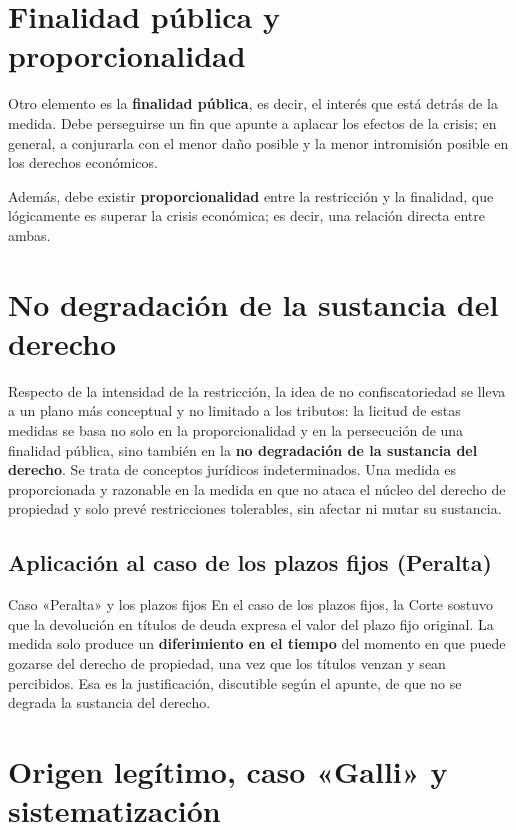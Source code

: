 \documentclass[12pt,oneside]{book}
\begin{document}
\section{Finalidad pública y proporcionalidad}

Otro elemento es la \textbf{finalidad pública}, es decir, el interés que está detrás de la medida. Debe perseguirse un fin que apunte a aplacar los efectos de la crisis; en general, a conjurarla con el menor daño posible y la menor intromisión posible en los derechos económicos.

Además, debe existir \textbf{proporcionalidad} entre la restricción y la finalidad, que lógicamente es superar la crisis económica; es decir, una relación directa entre ambas.

\section{No degradación de la sustancia del derecho}

Respecto de la intensidad de la restricción, la idea de no confiscatoriedad se lleva a un plano más conceptual y no limitado a los tributos: la licitud de estas medidas se basa no solo en la proporcionalidad y en la persecución de una finalidad pública, sino también en la \textbf{no degradación de la sustancia del derecho}. Se trata de conceptos jurídicos indeterminados. Una medida es proporcionada y razonable en la medida en que no ataca el núcleo del derecho de propiedad y solo prevé restricciones tolerables, sin afectar ni mutar su sustancia.

\subsection{Aplicación al caso de los plazos fijos (Peralta)}

\begin{example}{Caso «Peralta» y los plazos fijos}
En el caso de los plazos fijos, la Corte sostuvo que la devolución en títulos de deuda expresa el valor del plazo fijo original. La medida solo produce un \textbf{diferimiento en el tiempo} del momento en que puede gozarse del derecho de propiedad, una vez que los títulos venzan y sean percibidos. Esa es la justificación, discutible según el apunte, de que no se degrada la sustancia del derecho.
\end{example}

\section{Origen legítimo, caso «Galli» y sistematización}
\end{document}
